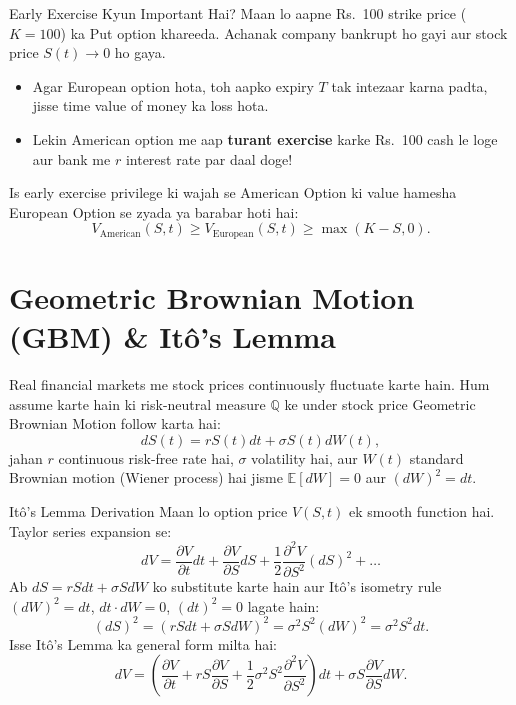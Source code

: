 \documentclass[11pt,a4paper,oneside]{book}
\begin{document}
\begin{intuitionbox}{Early Exercise Kyun Important Hai?}
Maan lo aapne Rs.~100 strike price ($K=100$) ka Put option khareeda. Achanak company bankrupt ho gayi aur stock price $S(t) \to 0$ ho gaya. 
\begin{itemize}
    \item Agar European option hota, toh aapko expiry $T$ tak intezaar karna padta, jisse time value of money ka loss hota.
    \item Lekin American option me aap \textbf{turant exercise} karke Rs.~100 cash le loge aur bank me $r$ interest rate par daal doge!
\end{itemize}
Is early exercise privilege ki wajah se American Option ki value hamesha European Option se zyada ya barabar hoti hai:
\begin{equation}
    V_{\text{American}}(S, t) \ge V_{\text{European}}(S, t) \ge \max(K - S, 0).
\end{equation}
\end{intuitionbox}

\section{Geometric Brownian Motion (GBM) \& It\^o's Lemma}
Real financial markets me stock prices continuously fluctuate karte hain. Hum assume karte hain ki risk-neutral measure $\mathbb{Q}$ ke under stock price Geometric Brownian Motion follow karta hai:
\begin{equation}
    dS(t) = r S(t) dt + \sigma S(t) dW(t),
\end{equation}
jahan $r$ continuous risk-free rate hai, $\sigma$ volatility hai, aur $W(t)$ standard Brownian motion (Wiener process) hai jisme $\mathbb{E}[dW] = 0$ aur $(dW)^2 = dt$.

\begin{mathbox}{It\^o's Lemma Derivation}
Maan lo option price $V(S, t)$ ek smooth function hai. Taylor series expansion se:
\begin{equation}
    dV = \frac{\partial V}{\partial t} dt + \frac{\partial V}{\partial S} dS + \frac{1}{2}\frac{\partial^2 V}{\partial S^2} (dS)^2 + \dots
\end{equation}
Ab $dS = rS dt + \sigma S dW$ ko substitute karte hain aur It\^o's isometry rule $(dW)^2 = dt$, $dt \cdot dW = 0$, $(dt)^2 = 0$ lagate hain:
\begin{equation}
    (dS)^2 = (rS dt + \sigma S dW)^2 = \sigma^2 S^2 (dW)^2 = \sigma^2 S^2 dt.
\end{equation}
Isse It\^o's Lemma ka general form milta hai:
\begin{equation}
    dV = \left( \frac{\partial V}{\partial t} + rS \frac{\partial V}{\partial S} + \frac{1}{2}\sigma^2 S^2 \frac{\partial^2 V}{\partial S^2} \right) dt + \sigma S \frac{\partial V}{\partial S} dW.
\end{equation}
\end{mathbox}
\end{document}

